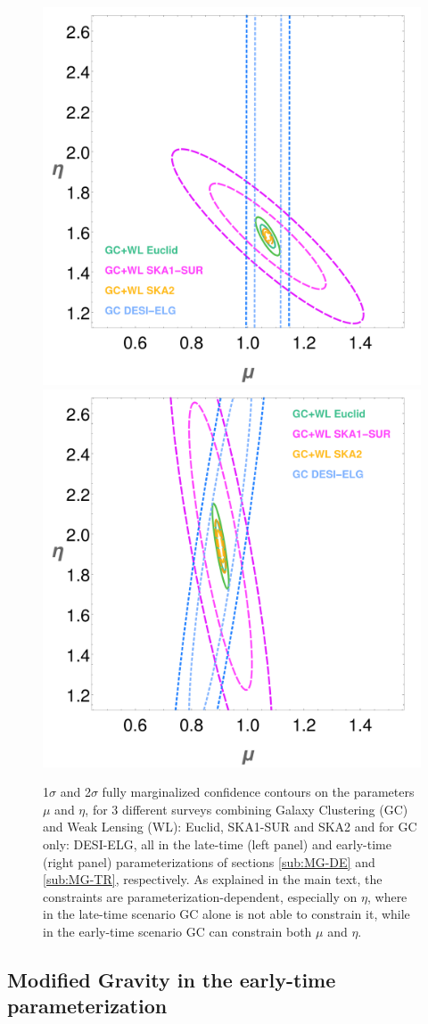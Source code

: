 \begin{figure}[htbp]
\centering
\includegraphics[width=0.35\linewidth]{Chapters/linear-nonlinear-MG-forecasts/figures/ellipses/DE-related/ellipsesPlot-withLegend-Ska2-SKA1-Euclid-DESI-MuEtaFisher-Marged-fiducialMGDE2nonuhs-GC+WL--nlHS-pars-6-7_-FixedRange.pdf}
\includegraphics[width=0.35\linewidth]{Chapters/linear-nonlinear-MG-forecasts/figures/ellipses/T-related/ellipsesPlot-withLegend-MuEtaFisher-Marged-AllSurveys-SKA1-SKA2-Euclid-DESI-fiducialMGTR2nonuhs-GC_GC+WL--nlHS-pars-6-7_-FixedRange.pdf}
\caption[Fisher confidence contours for future surveys in the late- and early-time parameterizations.]{\label{fig:combined_surveys}
1$\sigma$ and 2$\sigma$
fully marginalized confidence contours on the parameters
$\mu$ and $\eta$, for 3 different surveys combining Galaxy Clustering (GC) and Weak Lensing (WL): Euclid, SKA1-SUR
and SKA2 and for GC only: DESI-ELG, all in the late-time (left panel) and early-time (right panel) parameterizations
of sections \ref{sub:MG-DE} and \ref{sub:MG-TR}, respectively.
As explained in the main text, the constraints are parameterization-dependent, especially on $\eta$, where in
the late-time scenario GC alone is not able to constrain it, while in the early-time scenario GC can constrain both $\mu$ and $\eta$.
}
\end{figure}

\subsection{\label{sub:MG-TR} Modified Gravity in the early-time parameterization}

